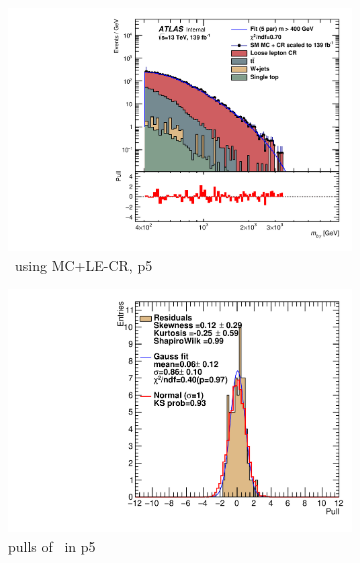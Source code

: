 \begin{figure}[H]
\begin{subfigure}[h]{0.38\linewidth}
    \includegraphics[scale=0.3]{figs/ch6/fit/variable_nosmooth/p5/10PB/output_SMMCplusCR_Mbg_p5.pdf}%
     \caption{\mbph \ using MC+LE-CR, p5}
     \end{subfigure}
     \hfill
    \begin{subfigure}[h]{0.4\linewidth}
    \includegraphics[scale=0.32]{figs/ch6/fit/variable_nosmooth/p5/10PB/pull_SMMCplusCR_Mbg_p5.pdf}%
    \caption{pulls of \mbph \ in p5}
    \end{subfigure}
    \hfill
    \begin{subfigure}[h]{0.38\linewidth}

\end{subfigure}
\end{figure}
